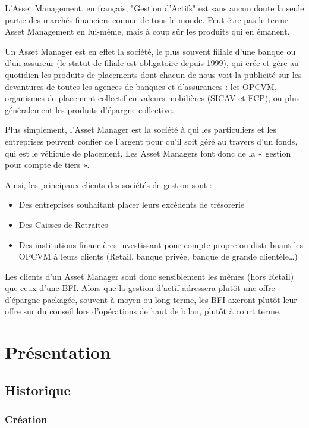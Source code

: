 \par L'Asset Management, en français, "Gestion d'Actifs" est sans aucun doute la seule partie des marchés financiers connue de tous le monde. Peut-être pas le terme Asset Management en lui-même, mais à coup sûr les produits qui en émanent.
\par Un Asset Manager est en effet la société, le plus souvent filiale d'une banque ou d'un assureur (le statut de filiale est obligatoire depuis 1999), qui crée et gère au quotidien les produits de placements dont chacun de nous voit la publicité sur les devantures de toutes les agences de banques et d'assurances : les OPCVM, organismes de placement collectif en valeurs mobilières (SICAV et FCP), ou plus généralement les produits d'épargne collective.
\par Plus simplement, l'Asset Manager est la société à qui les particuliers et les entreprises peuvent confier de l'argent pour qu'il soit géré au travers d'un fonds, qui est le véhicule de placement. Les Asset Managers font donc de la « gestion pour compte de tiers ».
\par Ainsi, les principaux clients des sociétés de gestion sont :
\begin{itemize}
    \item Des entreprises souhaitant placer leurs excédents de trésorerie
    \item Des Caisses de Retraites
    \item Des institutions financières investissant pour compte propre ou distribuant les OPCVM à leurs clients (Retail, banque privée, banque de grande clientèle…) 
\end{itemize}

\par Les clients d'un Asset Manager sont donc sensiblement les mêmes (hors Retail) que ceux d'une BFI. Alors que la gestion d'actif adressera plutôt une offre d'épargne packagée, souvent à moyen ou long terme, les BFI axeront plutôt leur offre sur du conseil lors d'opérations de haut de bilan, plutôt à court terme.

\section{Présentation}
\subsection{Historique}
\subsubsection{Création}

